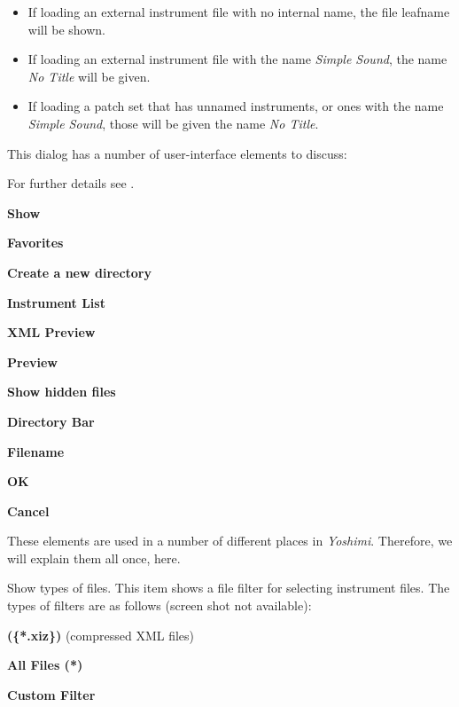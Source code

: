    \begin{itemize}
      \item If loading an external instrument file with no internal name,
         the file leafname will be shown.
      \item If loading an external instrument file with the name
         \textsl{Simple Sound}, the name \textsl{No Title} will be given.
      \item If loading a patch set that has unnamed instruments, or ones with
         the name \textsl{Simple Sound}, those will be given the name \textsl{No
         Title}.
   \end{itemize}

   This dialog has a number of user-interface elements to discuss:

   For further details see .

\iffalse
   \begin{enumber}
      \item \textbf{Show}
      \item \textbf{Favorites}
      \item \textbf{Create a new directory}
      \item \textbf{Instrument List}
      \item \textbf{XML Preview}
      \item \textbf{Preview}
      \item \textbf{Show hidden files}
      \item \textbf{Directory Bar}
      \item \textbf{Filename}
      \item \textbf{OK}
      \item \textbf{Cancel}
   \end{enumber}

   These elements are used in a number of different places in
   \textsl{Yoshimi}.
   Therefore, we will explain them all once, here.

   \setcounter{ItemCounter}{0}      %

   Show types of files.
   This item shows a file filter for selecting instrument files.
   The types of filters are as follows (screen shot not available):

   \begin{enumber}
      \item \textbf{(\{*.xiz\})} (compressed XML files)
      \item \textbf{All Files (*)}
      \item \textbf{Custom Filter}
   \end{enumber}

